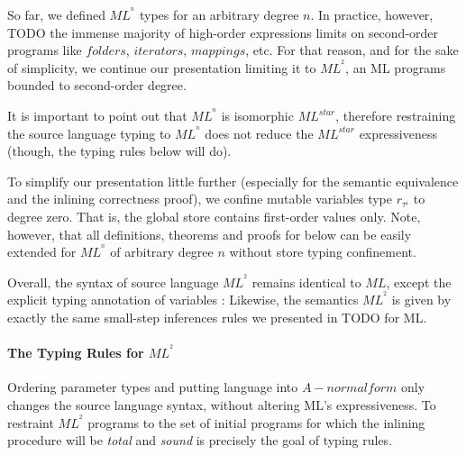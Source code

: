 \documentclass[a4paper,11pt,oneside]{article}
\theoremstyle{plain}
\newcommand{\bwedge}{\boldsymbol{~\wedge~}}
\newcommand{\inlsrc}{\textit{ML}^{^2}}
\newcommand{\inlT}{\inlsrc}
\begin{document}
So far, we defined $ML^{^{n}}$ types for an arbitrary degree $n$. In
practice, however, TODO the immense majority of high-order expressions
limits on second-order programs like $folders$, $iterators$, $mappings$,
etc.  For that reason, and for the sake of simplicity, we continue our
presentation limiting it to $ML^{^{2}}$, an ML programs bounded to
second-order degree.

It is important to point out that $ML^{^{n}}$ is isomorphic $ML^{star}$,
therefore restraining the source language typing to $ML^{^{n}}$ does not
reduce the $ML^{star}$ expressiveness (though, the typing rules below will
do).

To simplify our presentation little further (especially for the semantic
equivalence and the inlining correctness proof), we confine mutable
variables type $r_{\tau^i}$ to degree zero.  That is, the global store
contains first-order values only.  Note, however, that all definitions,
theorems and proofs for below can be easily extended for $ML^{^{n}}$ of
arbitrary degree $n$ without store typing confinement.

Overall, the syntax of source language $\inlT$ remains  identical to $ML$, 
except the explicit typing annotation of variables :
Likewise, the semantics $\inlsrc$ is given by exactly the same small-step 
inferences rules we presented in TODO for ML.

\paragraph*{The Typing Rules for $ML^{^{2}}$}

Ordering parameter types and putting language into $A-normal form$ only
changes the source language syntax, without altering ML's expressiveness. To
restraint $\inlsrc$ programs to the set of initial programs for which the
inlining procedure will be \textit{total} and \textit{sound} is precisely
the goal of typing rules.
 
\end{document}
